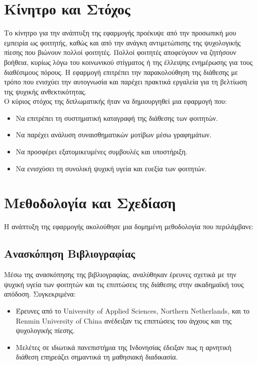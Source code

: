 \section*{Κίνητρο και Στόχος}
Το κίνητρο για την ανάπτυξη της εφαρμογής προέκυψε από την προσωπική μου εμπειρία ως φοιτητής, καθώς και από την ανάγκη αντιμετώπισης της ψυχολογικής πίεσης που βιώνουν πολλοί φοιτητές. Πολλοί φοιτητές αποφεύγουν να ζητήσουν βοήθεια, κυρίως λόγω του κοινωνικού στίγματος ή της έλλειψης ενημέρωσης για τους διαθέσιμους πόρους. Η εφαρμογή επιτρέπει την παρακολούθηση της διάθεσης με τρόπο που ενισχύει την αυτογνωσία και παρέχει πρακτικά εργαλεία για τη βελτίωση της ψυχικής ανθεκτικότητας.\vspace{5mm} \\
Ο κύριος στόχος της διπλωματικής ήταν να δημιουργηθεί μια εφαρμογή που:
\begin{itemize}
    \item Να επιτρέπει τη συστηματική καταγραφή της διάθεσης των φοιτητών.
    \item Να παρέχει ανάλυση συναισθηματικών μοτίβων μέσω γραφημάτων.
    \item Να προσφέρει εξατομικευμένες συμβουλές και υποστήριξη.
    \item Να ενισχύσει τη συνολική ψυχική υγεία και ευεξία των φοιτητών.
\end{itemize}

\section*{Μεθοδολογία και Σχεδίαση}
Η ανάπτυξη της εφαρμογής ακολούθησε μια δομημένη μεθοδολογία που περιλάμβανε:
\subsection*{Ανασκόπηση Βιβλιογραφίας}
Μέσω της ανασκόπησης της βιβλιογραφίας, αναλύθηκαν έρευνες σχετικά με την ψυχική υγεία των φοιτητών και τις επιπτώσεις της διάθεσης στην ακαδημαϊκή τους απόδοση. Συγκεκριμένα:
\begin{itemize}
    \item Έρευνες από το University of Applied Sciences, Northern Netherlands, και το Renmin University of China ανέδειξαν τις επιπτώσεις του άγχους και της ψυχολογικής πίεσης.
    \item Μελέτες σε ιδιωτικά πανεπιστήμια της Ινδονησίας έδειξαν πως η αρνητική διάθεση επηρεάζει σημαντικά τη μαθησιακή διαδικασία.
\end{itemize}


